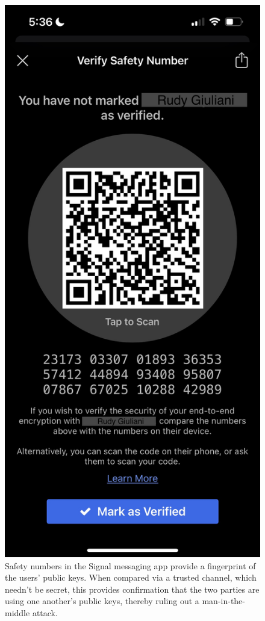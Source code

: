 \begin{figure}[!htb]
	\centering
	\includegraphics[width=0.8\columnwidth]{figures/Safety_number.jpeg}
	\caption{Safety numbers in the Signal messaging app provide a fingerprint of the users' public keys. When compared via a trusted channel, which needn't be secret, this provides confirmation that the two parties are using one another's public keys, thereby ruling out a man-in-the-middle attack.} \label{fig:safety_num}
\end{figure}


